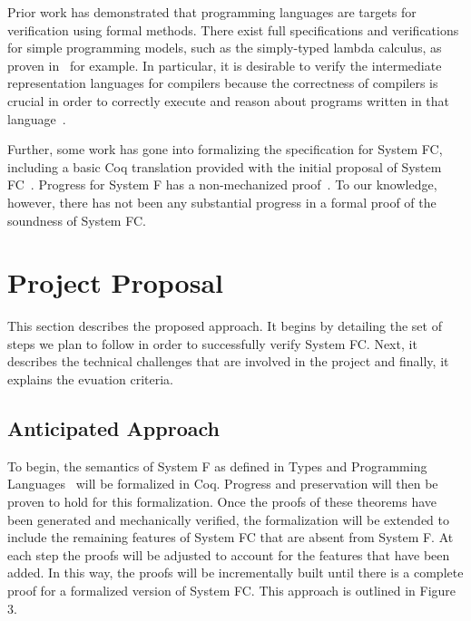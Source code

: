 \documentclass{sig-alternate}
\begin{document}
Prior work has demonstrated that programming languages are targets for verification using 
formal methods. There exist full specifications and verifications for simple programming
models, such as the simply-typed lambda calculus, as proven in~\cite{Pierce:SF} for example. In particular, it is desirable to verify the intermediate representation languages for compilers because the correctness of compilers is crucial in order to correctly execute and reason about programs written in that language~\cite{Zhao:2012:FLI:2103656.2103709}.

Further, some work has gone into formalizing the specification for System FC, including a basic 
Coq translation provided with the initial proposal of System FC~\cite{conf/tldi/SulzmannCJD07}. 
Progress for System F has a non-mechanized proof~\cite{Girard:1989:PT:64805}. To our knowledge, however, there has not been any substantial progress in a formal 
proof of the soundness of System FC.

\section{Project Proposal}
\label{sec:project_proposal}
This section describes the proposed approach. It begins by detailing the set of steps we plan to follow in order to successfully verify System FC. Next, it describes the technical challenges that are involved in the project and finally, it explains the evuation criteria.

\subsection{Anticipated Approach}
\label{subsec:approach}
To begin, the semantics of System F as defined in Types and Programming Languages~\cite{Pierce:SF} will be formalized in Coq. Progress and preservation will then be proven to hold for this formalization. Once the proofs of these theorems have been generated and mechanically verified, the formalization will be extended to include the remaining features of System FC that are absent from System F.  At each step the proofs will be adjusted to account for the features that have been added. In this way, the proofs will be incrementally built until there is a complete proof for a formalized version of System FC. This approach is outlined in Figure 3.
\end{document}
